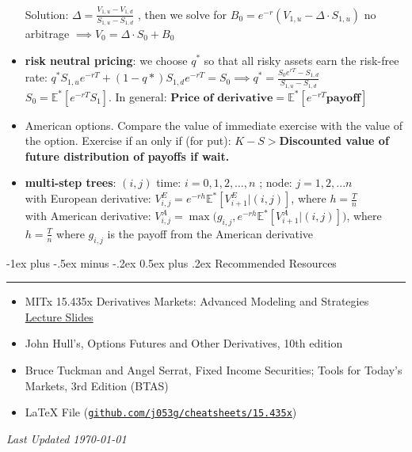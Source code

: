\documentclass[10pt,landscape,a4paper]{article}
\makeatletter
\renewcommand{\section}{\@startsection{section}{1}{0mm}%
                                {-1ex plus -.5ex minus -.2ex}%
                                {0.5ex plus .2ex}%
                                {\normalfont\large\bfseries}}
\makeatother
\begin{document}
\begin{multicols*}{3}
\begin{description}[topsep=0pt]
\begin{itemize}[topsep=0pt]
 		Solution: $\Delta = \frac{ V_{1,u}- V_{1,d}}{S_{1,u}-S_{1,d}}$ , then we solve for $B_0=e^{-r}(V_{1,u}-\Delta \cdot  S_{1,u})$
 		no arbitrage $\implies V_0= \Delta  \cdot S_0 + B_0$
 		\item \textbf{risk neutral pricing}: we choose $q^*$ so that all risky assets earn the risk-free rate:
 		$q^*S_{1,u} e^{-rT} + (1-q*)S_{1,d}e^{-rT}=S_0 \implies q^* = \frac{S_0 e^{rT}-S_{1,d}}{S_{1,u}-S_{1,d}}$ \\
 		$S_0 = \mathbb{E}^*[ e^{-rT} S_1]$. In general: $\textbf{Price of derivative} = \mathbb{E}^*[e^{-rT} \textbf{payoff}]$
 		\item American options.  Compare the value of immediate exercise with the value of the option. Exercise if an only if (for put): \textbf{ $K-S>$Discounted value of future distribution of payoffs if wait.}
 		\item \textbf{multi-step trees}:  $(i,j)$ time: $i=0,1,2,\dots, n$ ; node: $j=1,2,...n$ \\
 		with European derivative: $V^E_{i,j} = e^{-rh} \mathbb{E}^*[V^E_{i+1}|(i,j)]$, where $h=\frac{T}{n}$ \\
 		with American derivative: $V^A_{i,j} = \operatorname{max} \Big(g_{i,j}, e^{-rh} \mathbb{E}^*[V^A_{i+1}|(i,j)]\Big)$, where $h=\frac{T}{n}$ where $g_{i,j}$ is the payoff from the American derivative\\
 		
 		
 	\end{itemize}
 \end{description}
 
\newpage

\section{Recommended Resources} \smallskip \hrule height 1pt \smallskip

\bigskip

\begin{itemize}
\item MITx 15.435x 
Derivatives Markets: Advanced Modeling and Strategies \href{https://learning.edx.org/course/course-v1:MITx+15.435x+1T2021/home}{Lecture Slides}

\item John Hull’s, Options Futures and Other Derivatives, 10th edition
\item Bruce Tuckman and Angel Serrat, Fixed Income Securities; Tools for Today’s Markets, 3rd Edition (BTAS) 
\item LaTeX File (\texttt{\href{https://github.com/j053g/cheatsheets/blob/main/15.435x/15.435x_derivatives_markets.tex}{github.com/j053g/cheatsheets/15.435x}})
\end{itemize}





\begin{center}
	\emph{Last Updated \today}
\end{center}

\end{multicols*}
\end{document}
